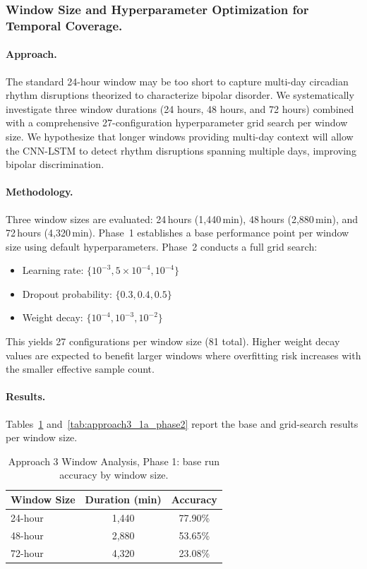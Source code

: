 \subsubsection{Window Size and Hyperparameter Optimization for Temporal Coverage.}

\paragraph{Approach.}
The standard 24-hour window may be too short to capture multi-day circadian rhythm disruptions theorized to characterize bipolar disorder. We systematically investigate three window durations (24 hours, 48 hours, and 72 hours) combined with a comprehensive 27-configuration hyperparameter grid search per window size. We hypothesize that longer windows providing multi-day context will allow the CNN-LSTM to detect rhythm disruptions spanning multiple days, improving bipolar discrimination.

\paragraph{Methodology.}
Three window sizes are evaluated: 24\,hours (1,440\,min), 48\,hours (2,880\,min), and 72\,hours (4,320\,min). Phase~1 establishes a base performance point per window size using default hyperparameters. Phase~2 conducts a full grid search:
\begin{itemize}[nosep]
  \item Learning rate: $\{10^{-3}, 5 \times 10^{-4}, 10^{-4}\}$
  \item Dropout probability: $\{0.3, 0.4, 0.5\}$
  \item Weight decay: $\{10^{-4}, 10^{-3}, 10^{-2}\}$
\end{itemize}
This yields 27 configurations per window size (81 total). Higher weight decay values are expected to benefit larger windows where overfitting risk increases with the smaller effective sample count.

\paragraph{Results.}
Tables~\ref{tab:approach3_1a_phase1} and~\ref{tab:approach3_1a_phase2} report the base and grid-search results per window size.

\begin{table}[H]
\centering
\caption{Approach 3 Window Analysis, Phase 1: base run accuracy by window size.}
\label{tab:approach3_1a_phase1}
\begin{tabular}{lcc}
\toprule
\textbf{Window Size} & \textbf{Duration (min)} & \textbf{Accuracy} \\
\midrule
24-hour & 1,440 & 77.90\% \\
48-hour & 2,880 & 53.65\% \\
72-hour & 4,320 & 23.08\% \\
\bottomrule
\end{tabular}
\end{table}

